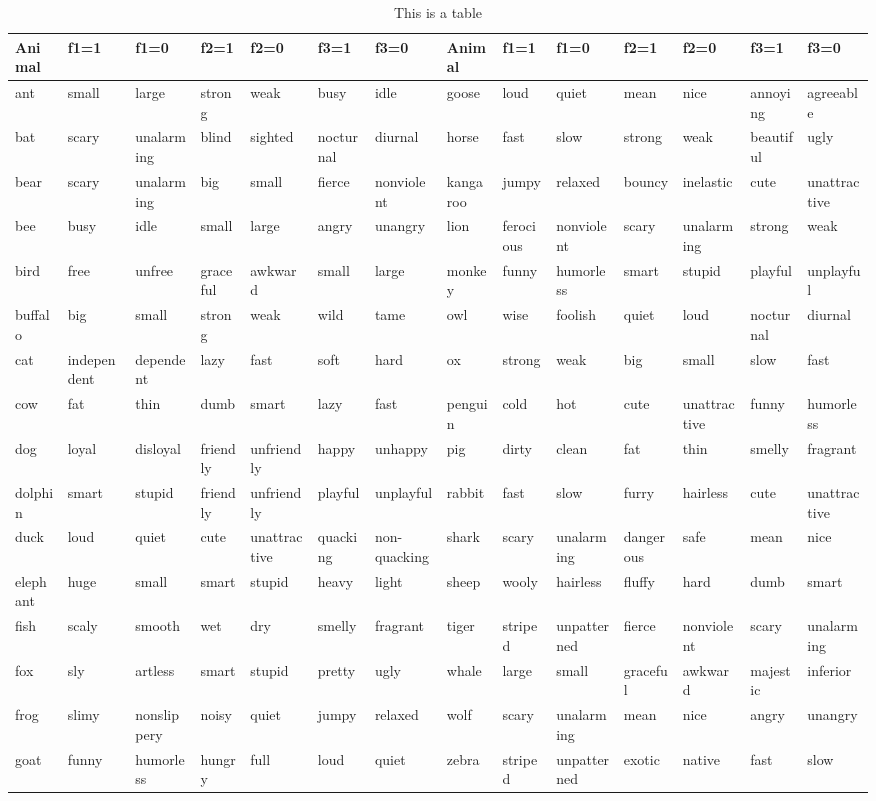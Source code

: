 \documentclass[10pt,letterpaper]{article}
\begin{document}
\begin{table}[t]
\tabcolsep=0.02cm
\small
\caption{This is a table}
\begin{tabular}{llllllllllllll}

\toprule
Animal & f1=1 & f1=0 & f2=1 & f2=0 & f3=1 & f3=0 & Animal & f1=1 & f1=0 & f2=1 & f2=0 & f3=1 & f3=0 \\
\midrule
ant & small & large & strong & weak & busy & idle & goose & loud & quiet & mean & nice & annoying & agreeable \\
bat & scary & unalarming & blind & sighted & nocturnal & diurnal & horse & fast & slow & strong & weak & beautiful & ugly \\
bear & scary & unalarming & big & small & fierce & nonviolent & kangaroo & jumpy & relaxed & bouncy & inelastic & cute & unattractive \\
bee & busy & idle & small & large & angry & unangry & lion & ferocious & nonviolent & scary & unalarming & strong & weak \\
bird & free & unfree & graceful & awkward & small & large & monkey & funny & humorless & smart & stupid & playful & unplayful \\
buffalo & big & small & strong & weak & wild & tame & owl & wise & foolish & quiet & loud & nocturnal & diurnal \\
cat & independent & dependent & lazy & fast & soft & hard & ox & strong & weak & big & small & slow & fast \\
cow & fat & thin & dumb & smart & lazy & fast & penguin & cold & hot & cute & unattractive & funny & humorless \\
dog & loyal & disloyal & friendly & unfriendly & happy & unhappy & pig & dirty & clean & fat & thin & smelly & fragrant \\
dolphin & smart & stupid & friendly & unfriendly & playful & unplayful & rabbit & fast & slow & furry & hairless & cute & unattractive \\
duck & loud & quiet & cute & unattractive & quacking & non-quacking & shark & scary & unalarming & dangerous & safe & mean & nice \\
elephant & huge & small & smart & stupid & heavy & light & sheep & wooly & hairless & fluffy & hard & dumb & smart \\
fish & scaly & smooth & wet & dry & smelly & fragrant & tiger & striped & unpatterned & fierce & nonviolent & scary & unalarming \\
fox & sly & artless & smart & stupid & pretty & ugly & whale & large & small & graceful & awkward & majestic & inferior \\
frog & slimy & nonslippery & noisy & quiet & jumpy & relaxed & wolf & scary & unalarming & mean & nice & angry & unangry \\
goat & funny & humorless & hungry & full & loud & quiet & zebra & striped & unpatterned & exotic & native & fast & slow \\

\bottomrule
\end{tabular}
\end{table}
\end{document}
